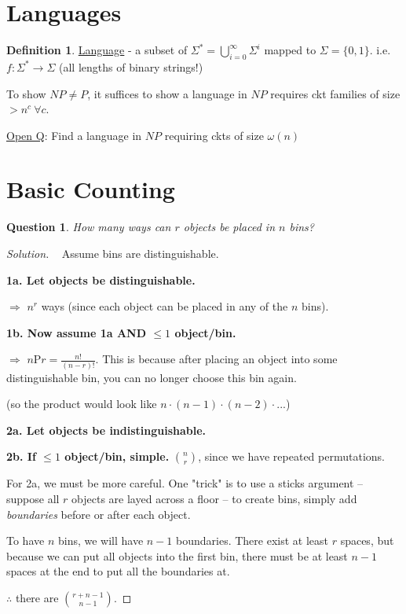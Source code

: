\documentclass[psamsfonts, 12pt]{amsart}
\newtheorem{quest}[thm]{Question}
\theoremstyle{definition}
\newtheorem{defn}[thm]{Definition}
\theoremstyle{remark}
\newenvironment{solution}
  {\begin{proof}[Solution]}
  {\end{proof}}
\begin{document}
\section{Languages}

\begin{defn}
\underline{Language} - a subset of $\Sigma^{*} = \bigcup_{i=0}^{\infty}\Sigma^{i}$ mapped to $\Sigma = \{0,1\}$. i.e. $f:\Sigma^{*} \rightarrow \Sigma $ (all lengths of binary strings!)
\end{defn}

To show $NP\neq P$, it suffices to show a language in $NP$ requires ckt families of size $> n^c\ \forall c$.

\underline{Open Q}: Find a language in $NP$ requiring ckts of size $\omega(n)$

\pagebreak

\section{Basic Counting}

\begin{quest}
How many ways can $r$ objects be placed in $n$ bins?
\end{quest}

\begin{solution}\
\vspace{0.5em}
Assume bins are distinguishable.

\textbf{1a. Let objects be distinguishable.}

$\Rightarrow$ $n^r$ ways (since each object can be placed in any of the $n$ bins).

\vspace{0.5em}
\textbf{1b. Now assume 1a AND $\leq 1$ object/bin.}

$\Rightarrow$ $n$P$r = \frac{n!}{(n-r)!}$. This is because after placing an object into some distinguishable bin, you can no longer choose this bin again.

(so the product would look like $n\cdot(n-1)\cdot(n-2)\cdot ... $)

\vspace{1em}

\textbf{2a. Let objects be indistinguishable.}

\vspace{0.5em}

\textbf{2b. If $\leq 1$ object/bin, simple.} $n\choose r$, since we have repeated permutations.

\vspace{0.5em}
For 2a, we must be more careful. One "trick" is to use a sticks argument -- suppose all $r$ objects are layed across a floor -- to create bins, simply add \textit{boundaries} before or after each object.

To have $n$ bins, we will have $n-1$ boundaries. There exist at least $r$ spaces, but because we can put all objects into the first bin, there must be at least $n-1$ spaces at the end to put all the boundaries at.

$\therefore$ there are ${r+n-1}\choose{n-1}$.
\end{solution}
\end{document}
